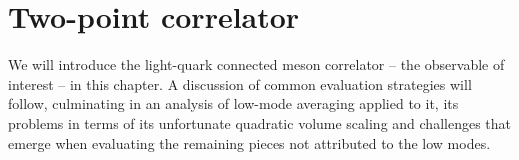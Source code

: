 \chapter{Two-point correlator}
\label{ch:p2:2pt-corr}



We will introduce the light-quark connected meson correlator -- the observable of interest -- in this chapter.
A discussion of common evaluation strategies will follow, culminating in an analysis of low-mode averaging applied to it, its problems in terms of its unfortunate quadratic volume scaling and challenges that emerge when evaluating the remaining pieces not attributed to the low modes.




